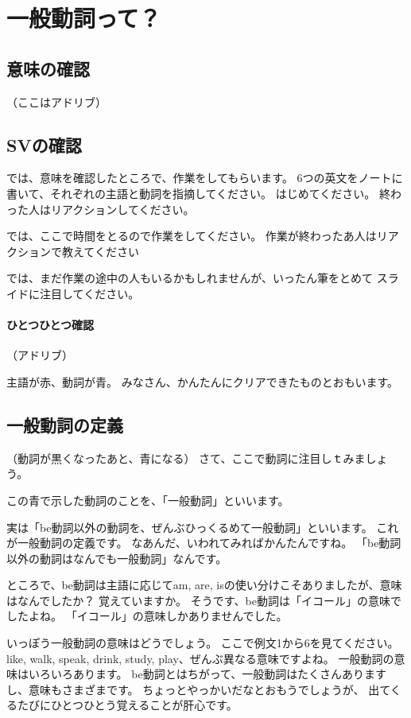 \documentclass[book,jafontscale=0.9247]{jlreq}
\newcommand{\mySagyo}{%
\par%
\bigskip
では、ここで時間をとるので作業をしてください。
作業が終わったあ人はリアクションで教えてください\par%
\begin{minipage}[t]{.98\textwidth}
\mbox{}\hrulefill\mbox{}\par%
\mbox{}\hfill{}\raisebox{-.5\height}{作業}\hfill\mbox{}\par%
\mbox{}\hrulefill\mbox{}
\end{minipage}%
\par%
\bigskip%
では、まだ作業の途中の人もいるかもしれませんが、いったん筆をとめて
スライドに注目してください。%
\par%
\bigskip
}
\begin{document}
\section{一般動詞って？}

\subsection{意味の確認}

（ここはアドリブ）

\subsection{SVの確認}

では、意味を確認したところで、作業をしてもらいます。
6つの英文をノートに書いて、それぞれの主語と動詞を指摘してください。
はじめてください。
終わった人はリアクションしてください。

\mySagyo


\paragraph{ひとつひとつ確認}

（アドリブ）

主語が赤、動詞が青。
みなさん、かんたんにクリアできたものとおもいます。

\subsection{一般動詞の定義}
（動詞が黒くなったあと、青になる）
さて、ここで動詞に注目しｔみましょう。

この青で示した動詞のことを、「一般動詞」といいます。

実は「be動詞以外の動詞を、ぜんぶひっくるめて一般動詞」といいます。
これが一般動詞の定義です。
なあんだ、いわれてみればかんたんですね。
「be動詞以外の動詞はなんでも一般動詞」なんです。

ところで、be動詞は主語に応じてam, are, isの使い分けこそありましたが、意味はなんでしたか？
覚えていますか。
そうです、be動詞は「イコール」の意味でしたよね。
「イコール」の意味しかありませんでした。

いっぽう一般動詞の意味はどうでしょう。
ここで例文1から6を見てください。
like, walk, speak, drink, study, play、ぜんぶ異なる意味ですよね。
一般動詞の意味はいろいろあります。
be動詞とはちがって、一般動詞はたくさんありますし、意味もさまざまです。
ちょっとやっかいだなとおもうでしょうが、
出てくるたびにひとつひとう覚えることが肝心です。
\end{document}
